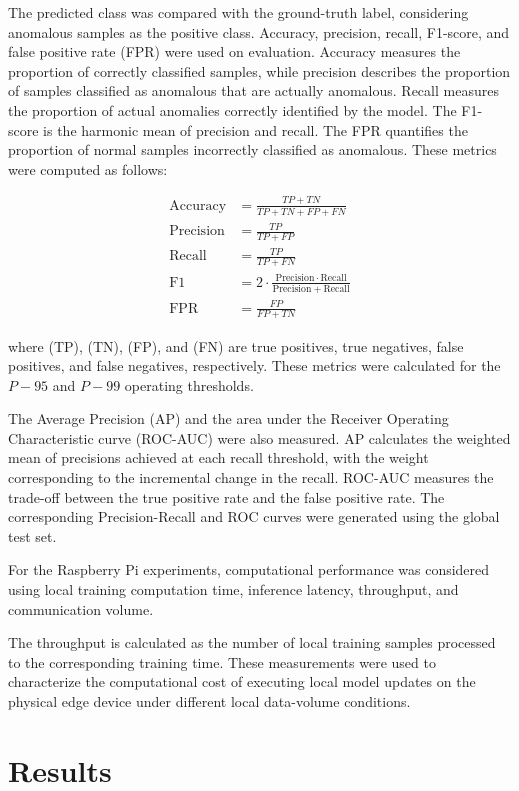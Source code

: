 \documentclass[12pt]{article}
\begin{document}
The predicted class was compared with the ground-truth label, considering anomalous samples as the positive class. Accuracy, precision, recall, F1-score, and false positive rate (FPR) were used on evaluation. Accuracy measures the proportion of correctly classified samples, while precision describes the proportion of samples classified as anomalous that are actually anomalous. Recall measures the proportion of actual anomalies correctly identified by the model. The F1-score is the harmonic mean of precision and recall. The FPR quantifies the proportion of normal samples incorrectly classified as anomalous. These metrics were computed as follows:

\begin{align}
	\mathrm{Accuracy} &= \frac{TP+TN}{TP+TN+FP+FN} \\
	\mathrm{Precision} &= \frac{TP}{TP+FP} \\
	\mathrm{Recall} &= \frac{TP}{TP+FN} \\
	\mathrm{F1} &= 2 \cdot
	\frac{\mathrm{Precision}\cdot\mathrm{Recall}}
	{\mathrm{Precision}+\mathrm{Recall}} \\
	\mathrm{FPR} &= \frac{FP}{FP+TN}
\end{align}

where (TP), (TN), (FP), and (FN) are true positives, true negatives, false positives, and false negatives, respectively. These metrics were calculated for the $P-95$ and $P-99$ operating thresholds.

The Average Precision (AP) and the area under the Receiver Operating Characteristic curve (ROC-AUC) were also measured. AP calculates the weighted mean of precisions achieved at each recall threshold, with the weight corresponding to the incremental change in the recall. ROC-AUC measures the trade-off between the true positive rate and the false positive rate. The corresponding Precision-Recall and ROC curves were generated using the global test set.

For the Raspberry Pi experiments, computational performance was considered using local training computation time, inference latency, throughput, and communication volume.

The throughput is calculated as the number of local training samples processed to the corresponding training time. These measurements were used to characterize the computational cost of executing local model updates on the physical edge device under different local data-volume conditions.


\section{Results}
\label{sec:Results}
\end{document}
